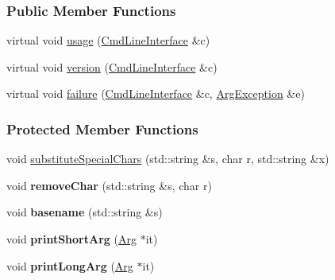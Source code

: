 \subsubsection*{Public Member Functions}
\begin{DoxyCompactItemize}
\item 
virtual void \hyperlink{classTCLAP_1_1DocBookOutput_adc1ec93f3f7e5e912690be01c5e7d6e2}{usage} (\hyperlink{classTCLAP_1_1CmdLineInterface}{Cmd\+Line\+Interface} \&c)
\item 
virtual void \hyperlink{classTCLAP_1_1DocBookOutput_a3ccf7671dcae82aba5f0e91850ae25a4}{version} (\hyperlink{classTCLAP_1_1CmdLineInterface}{Cmd\+Line\+Interface} \&c)
\item 
virtual void \hyperlink{classTCLAP_1_1DocBookOutput_a5e97f659fa1ab3b060a31e8bd7a0a40e}{failure} (\hyperlink{classTCLAP_1_1CmdLineInterface}{Cmd\+Line\+Interface} \&c, \hyperlink{classTCLAP_1_1ArgException}{Arg\+Exception} \&e)
\end{DoxyCompactItemize}
\subsubsection*{Protected Member Functions}
\begin{DoxyCompactItemize}
\item 
void \hyperlink{classTCLAP_1_1DocBookOutput_a7546eaf3a0effeea1030afb27b4c698f}{substitute\+Special\+Chars} (std\+::string \&s, char r, std\+::string \&x)
\item 
void {\bfseries remove\+Char} (std\+::string \&s, char r)\hypertarget{classTCLAP_1_1DocBookOutput_abc059536cb97c49da4e6c5b4a22c6cef}{}\label{classTCLAP_1_1DocBookOutput_abc059536cb97c49da4e6c5b4a22c6cef}

\item 
void {\bfseries basename} (std\+::string \&s)\hypertarget{classTCLAP_1_1DocBookOutput_a82d49ab25845c7d191863be9c482409e}{}\label{classTCLAP_1_1DocBookOutput_a82d49ab25845c7d191863be9c482409e}

\item 
void {\bfseries print\+Short\+Arg} (\hyperlink{classTCLAP_1_1Arg}{Arg} $\ast$it)\hypertarget{classTCLAP_1_1DocBookOutput_a980ecacfcda0186a76bb6c37a9c33726}{}\label{classTCLAP_1_1DocBookOutput_a980ecacfcda0186a76bb6c37a9c33726}

\item 
void {\bfseries print\+Long\+Arg} (\hyperlink{classTCLAP_1_1Arg}{Arg} $\ast$it)\hypertarget{classTCLAP_1_1DocBookOutput_a891cf5ef71592b5261691575c2adad1d}{}\label{classTCLAP_1_1DocBookOutput_a891cf5ef71592b5261691575c2adad1d}

\end{DoxyCompactItemize}
